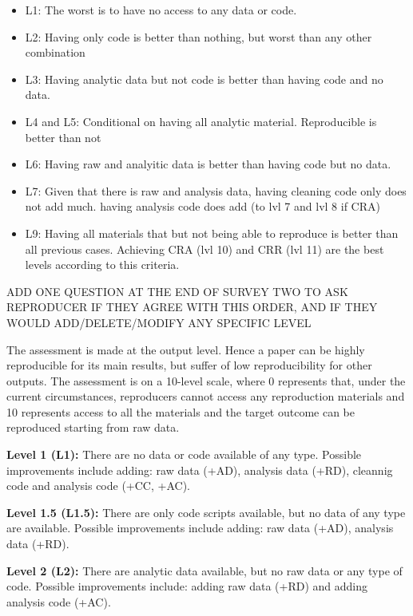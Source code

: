 \documentclass[]{book}
\providecommand{\tightlist}{%
  \setlength{\itemsep}{0pt}\setlength{\parskip}{0pt}}
\begin{document}
\begin{itemize}
\tightlist
\item
  L1: The worst is to have no access to any data or code.\\
\item
  L2: Having only code is better than nothing, but worst than any other combination\\
\item
  L3: Having analytic data but not code is better than having code and no data.
\item
  L4 and L5: Conditional on having all analytic material. Reproducible is better than not
\item
  L6: Having raw and analyitic data is better than having code but no data.\\
\item
  L7: Given that there is raw and analysis data, having cleaning code only does not add much. having analysis code does add (to lvl 7 and lvl 8 if CRA)\\
\item
  L9: Having all materials that but not being able to reproduce is better than all previous cases. Achieving CRA (lvl 10) and CRR (lvl 11) are the best levels according to this criteria.
\end{itemize}

ADD ONE QUESTION AT THE END OF SURVEY TWO TO ASK REPRODUCER IF THEY AGREE WITH THIS ORDER, AND IF THEY WOULD ADD/DELETE/MODIFY ANY SPECIFIC LEVEL

The assessment is made at the output level. Hence a paper can be highly reproducible for its main results, but suffer of low reproducibility for other outputs. The assessment is on a 10-level scale, where 0 represents that, under the current circumstances, reproducers cannot access any reproduction materials and 10 represents access to all the materials and the target outcome can be reproduced starting from raw data.

\textbf{Level 1 (L1):} There are no data or code available of any type. Possible improvements include adding: raw data (+AD), analysis data (+RD), cleannig code and analysis code (+CC, +AC).

\textbf{Level 1.5 (L1.5):} There are only code scripts available, but no data of any type are available. Possible improvements include adding: raw data (+AD), analysis data (+RD).

\textbf{Level 2 (L2):} There are analytic data available, but no raw data or any type of code. Possible improvements include: adding raw data (+RD) and adding analysis code (+AC).
\end{document}
